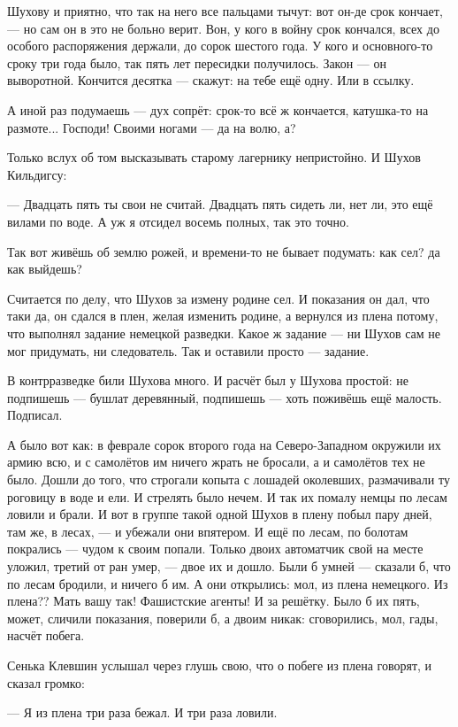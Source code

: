 Шухову и приятно, что так на него все пальцами тычут: вот он-де срок кончает, --- но сам он в это
не больно верит. Вон, у кого в войну срок кончался, всех до особого распоряжения держали, до
сорок шестого года. У кого и основного-то сроку три года было, так пять лет пересидки
получилось. Закон --- он выворотной. Кончится десятка --- скажут: на тебе ещё одну. Или в ссылку.

А иной раз подумаешь --- дух сопрёт: срок-то всё ж кончается, катушка-то на размоте... Господи!
Своими ногами --- да на волю, а?

Только вслух об том высказывать старому лагернику непристойно. И Шухов Кильдигсу:

--- Двадцать пять ты свои не считай. Двадцать пять сидеть ли, нет ли, это ещё вилами по воде. А
уж я отсидел восемь полных, так это точно.

Так вот живёшь об землю рожей, и времени-то не бывает подумать: как сел? да как выйдешь?

Считается по делу, что Шухов за измену родине сел. И показания он дал, что таки да, он сдался в
плен, желая изменить родине, а вернулся из плена потому, что выполнял задание немецкой
разведки. Какое ж задание --- ни Шухов сам не мог придумать, ни следователь. Так и оставили
просто --- задание.

В контрразведке били Шухова много. И расчёт был у Шухова простой: не подпишешь --- бушлат
деревянный, подпишешь --- хоть поживёшь ещё малость. Подписал.

А было вот как: в феврале сорок второго года на Северо-Западном окружили их армию всю, и с
самолётов им ничего жрать не бросали, а и самолётов тех не было. Дошли до того, что строгали
копыта с лошадей околевших, размачивали ту роговицу в воде и ели. И стрелять было нечем. И так
их помалу немцы по лесам ловили и брали. И вот в группе такой одной Шухов в плену побыл пару
дней, там же, в лесах, --- и убежали они впятером. И ещё по лесам, по болотам покрались --- чудом к
своим попали. Только двоих автоматчик свой на месте уложил, третий от ран умер, --- двое их и
дошло. Были б умней --- сказали б, что по лесам бродили, и ничего б им. А они открылись: мол, из
плена немецкого. Из плена?? Мать вашу так! Фашистские агенты! И за решётку. Было б их пять,
может, сличили показания, поверили б, а двоим никак: сговорились, мол, гады, насчёт побега.

Сенька Клевшин услышал через глушь свою, что о побеге из плена говорят, и сказал громко:

--- Я из плена три раза бежал. И три раза ловили.

